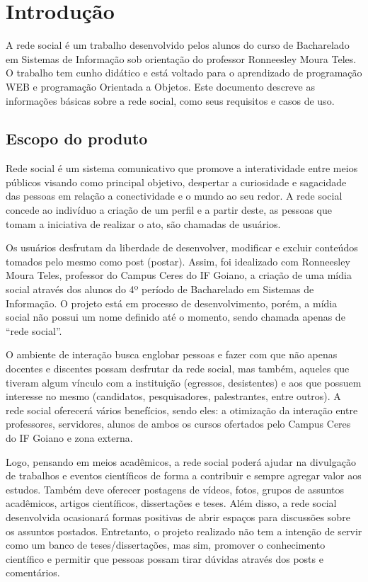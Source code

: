\chapter{Introdução}

A rede social é um trabalho desenvolvido pelos alunos do curso de Bacharelado em Sistemas de Informação sob orientação do professor Ronneesley Moura Teles.
O trabalho tem cunho didático e está voltado para o aprendizado de programação WEB e programação Orientada a Objetos.
Este documento descreve as informações básicas sobre a rede social, como seus requisitos e casos de uso.


\section{Escopo do produto}
Rede social é um sistema comunicativo que promove a interatividade entre meios públicos
visando como principal objetivo, despertar a curiosidade e sagacidade das pessoas em relação a
conectividade e o mundo ao seu redor. A rede social concede ao indivíduo a criação de um perfil e a
partir deste, as pessoas que tomam a iniciativa de realizar o ato, são chamadas de usuários.

Os usuários desfrutam da liberdade de desenvolver, modificar e excluir conteúdos tomados
pelo mesmo como post (postar). Assim, foi idealizado com Ronneesley Moura Teles, professor do
Campus Ceres do IF Goiano, a criação de uma mídia social através dos alunos do 4º período de
Bacharelado em Sistemas de Informação. O projeto está em processo de desenvolvimento, porém, a
mídia social não possui um nome definido até o momento, sendo chamada apenas de “rede social”.

O ambiente de interação busca englobar pessoas e fazer com que não apenas docentes e
discentes possam desfrutar da rede social, mas também, aqueles que tiveram algum vínculo com a
instituição (egressos, desistentes) e aos que possuem interesse no mesmo (candidatos,
pesquisadores, palestrantes, entre outros). A rede social oferecerá vários benefícios, sendo eles: a
otimização da interação entre professores, servidores, alunos de ambos os cursos ofertados pelo
Campus Ceres do IF Goiano e zona externa.

Logo, pensando em meios acadêmicos, a rede social poderá ajudar na divulgação de trabalhos
e eventos científicos de forma a contribuir e sempre agregar valor aos estudos. Também deve oferecer postagens de vídeos, fotos, grupos de assuntos acadêmicos, artigos
científicos, dissertações e teses. Além disso, a rede social desenvolvida ocasionará formas positivas de
abrir espaços para discussões sobre os assuntos postados. Entretanto, o projeto realizado não tem a
intenção de servir como um banco de teses/dissertações, mas sim, promover o conhecimento
científico e permitir que pessoas possam tirar dúvidas através dos posts e comentários.
  

